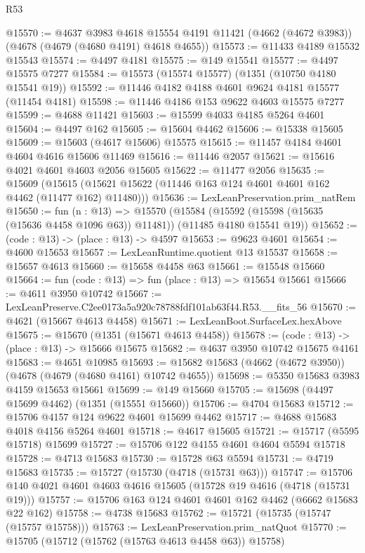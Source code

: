 \begin{lexlean}{R53}
\begin{coremodule}
@15570 := @4637
    @3983
    @4618
    @15554
    @4191
    @11421
    (@4662 (@4672 @3983))
    (@4678 (@4679 (@4680 @4191) @4618 @4655))
@15573 := @11433 @4189 @15532 @15543
@15574 := @4497 @4181
@15575 := @149 @15541
@15577 := @4497 @15575 @7277
@15584 := @15573 (@15574 @15577) (@1351 (@10750 @4180 @15541 @19))
@15592 := @11446 @4182 @4188 @4601 @9624 @4181 @15577 (@11454 @4181)
@15598 := @11446 @4186 @153 @9622 @4603 @15575 @7277
@15599 := @4688 @11421
@15603 := @15599 @4033 @4185 @5264 @4601
@15604 := @4497 @162
@15605 := @15604 @4462
@15606 := @15338 @15605
@15609 := @15603 (@4617 @15606) @15575
@15615 := @11457 @4184 @4601 @4604 @4616 @15606 @11469
@15616 := @11446 @2057
@15621 := @15616 @4021 @4601 @4603 @2056 @15605
@15622 := @11477 @2056
@15635 := @15609
    (@15615 (@15621 @15622 (@11446 @163 @124 @4601 @4601 @162 @4462 (@11477 @162) @11480)))
@15636 := LexLeanPreservation.prim_natRem
@15650 := fun (n : @13) =>
  @15570
    (@15584 (@15592 (@15598 (@15635 (@15636 @4458 @1096 @63)) @11481)) (@11485 @4180 @15541 @19))
@15652 := (code : @13) -> (place : @13) -> @4597
@15653 := @9623 @4601
@15654 := @4600 @15653
@15657 := LexLeanRuntime.quotient @13 @15537
@15658 := @15657 @4613
@15660 := @15658 @4458 @63
@15661 := @15548 @15660
@15664 := fun (code : @13) => fun (place : @13) => @15654 @15661
@15666 := @4611 @3950 @10742
@15667 := LexLeanPreserve.C2ee0173a5a920c78788fdf101ab63f44.R53.__fits_56
@15670 := @4621 (@15667 @4613 @4458)
@15671 := LexLeanBoot.SurfaceLex.hexAbove
@15675 := @15670 (@1351 (@15671 @4613 @4458))
@15678 := (code : @13) -> (place : @13) -> @15666 @15675
@15682 := @4637 @3950 @10742 @15675 @4161
@15683 := @4651 @10985
@15693 := @15682 @15683 (@4662 (@4672 @3950)) (@4678 (@4679 (@4680 @4161) @10742 @4655))
@15698 := @5350 @15683 @3983 @4159 @15653 @15661
@15699 := @149 @15660
@15705 := @15698 (@4497 @15699 @4462) (@1351 (@15551 @15660))
@15706 := @4704 @15683
@15712 := @15706 @4157 @124 @9622 @4601 @15699 @4462
@15717 := @4688 @15683 @4018 @4156 @5264 @4601
@15718 := @4617 @15605
@15721 := @15717 (@5595 @15718) @15699
@15727 := @15706 @122 @4155 @4601 @4604 @5594 @15718
@15728 := @4713 @15683
@15730 := @15728 @63 @5594
@15731 := @4719 @15683
@15735 := @15727 (@15730 (@4718 (@15731 @63)))
@15747 := @15706 @140 @4021 @4601 @4603 @4616 @15605 (@15728 @19 @4616 (@4718 (@15731 @19)))
@15757 := @15706 @163 @124 @4601 @4601 @162 @4462 (@6662 @15683 @22 @162)
@15758 := @4738 @15683
@15762 := @15721 (@15735 (@15747 (@15757 @15758)))
@15763 := LexLeanPreservation.prim_natQuot
@15770 := @15705 (@15712 (@15762 (@15763 @4613 @4458 @63)) @15758)

\end{coremodule}
\end{lexlean}
